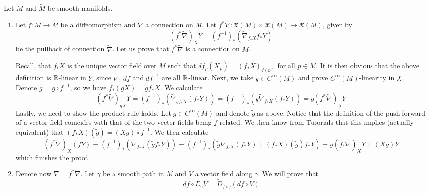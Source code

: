 \documentclass[a4paper, 12pt]{article}
\begin{document}
\begin{Exercise}
    Let $M$ and $\tilde{M}$ be smooth manifolds.
    \begin{enumerate}[label=(\roman*)]
        \item Let $f \colon M \to \tilde{M}$ be a diffeomorphism and $\tilde{\nabla}$ a connection on $\tilde{M}$.
            Let $f^*\tilde{\nabla} \colon \mathfrak{X}(M) \times \mathfrak{X}(M) \to \mathfrak{X}(M)$, given by
            \[
                \left( f^*\tilde{\nabla} \right)_X Y = (f^{-1})_* \left( \tilde{\nabla}_{f_*X}f_*Y \right)
            \]
            be the pullback of connection $\tilde{\nabla}$.
            Let us prove that $f^*\tilde{\nabla}$ is a connection on $M$.

            Recall, that $f_*X$ is the unique vector field over $\tilde{M}$ such that $df_p(X_p) = (f_*X)_{f(p)}$ for all $p \in M$.
            It is then obvious that the above definition is $\mathbb{R}$-linear in $Y$, since $\tilde{\nabla}$, $df$ and $df^{-1}$ are all $\mathbb{R}$-linear.
            Next, we take $g \in C^\infty(M)$ and prove $C^\infty(M)$-linearity in $X$.
            Denote $\tilde{g} = g \circ f^{-1}$, so we have $f_*(gX) = \tilde{g} f_*X$.
            We calculate
            \[
                \left( f^*\tilde{\nabla} \right)_{gX} Y
                = (f^{-1})_* (\tilde{\nabla}_{\tilde{g}f_*X}(f_*Y))
                = (f^{-1})_* (\tilde{g}\tilde{\nabla}_{f_*X}(f_*Y))
                = g \left( f^*\tilde{\nabla} \right)_X Y
            \]
            Lastly, we need to show the product rule holds.
            Let $g \in C^\infty(M)$ and denote $\tilde{g}$ as above.
            Notice that the definition of the push-forward of a vector field coincides with that of the two vector fields being $f$-related.
            We then know from Tutorials that this implies (actually equivalent) that
            $(f_*X)(\tilde{g}) = (Xg) \circ f^{-1}$.
            We then calculate
            \[
                \left( f^*\tilde{\nabla} \right)_X(fY)
                = (f^{-1})_* (\tilde{\nabla}_{f_*X}(\tilde{g}f_*Y))
                = (f^{-1})_* (\tilde{g}\tilde{\nabla}_{f_*X}(f_*Y) + (f_*X)(\tilde{g})f_*Y)
                = g(f_*\tilde{\nabla})_XY + (Xg)Y
            \]
            which finishes the proof.
        \item Denote now $\nabla = f^*\tilde{\nabla}$.
            Let $\gamma$ be a smooth path in $M$ and $V$ a vector field along $\gamma$.
            We will prove that
            \[
                df \circ D_\gamma V = \tilde{D}_{f\circ\gamma}(df \circ V)
            \]


\end{enumerate}
\end{Exercise}
\end{document}
